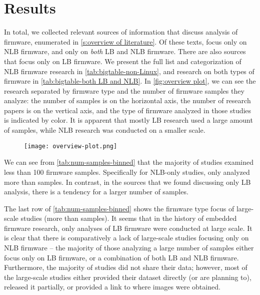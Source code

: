 \section{Results}\label{s:results}

In total, we collected  relevant sources of information that discuss analysis of firmware, enumerated in \autoref{s:overview of literature}.
Of these  texts,  focus only on NLB firmware, and  only on \textit{both} LB and NLB firmware.
There are also  sources that focus only on LB firmware.
We present the full list and categorization of NLB firmware research in \autoref{tab:bigtable-non-Linux}, and research on both types of firmware in \autoref{tab:bigtable-both LB and NLB}.
In \autoref{fig:overview plot}, we can see the research separated by firmware type and the number of firmware samples they analyze: the number of samples is on the horizontal axis, the number of research papers is on the vertical axis, and the type of firmware analyzed in those studies is indicated by color.
It is apparent that mostly LB research used a large amount of samples, while NLB research was conducted on a smaller scale.

\begin{figure}[hb]
  \centering
  \texttt{[image: overview-plot.png]}
  \label{fig:overview plot}
\end{figure}

We can see from \autoref{tab:num-samples-binned} that the majority of studies examined less than \num{100} firmware samples.
Specifically for NLB-only studies, only  analyzed more than  samples.
In contrast, in the sources that we found discussing only LB analysis, there is a tendency for a larger number of samples.


The last row of \autoref{tab:num-samples-binned} shows the firmware type focus of large-scale studies (more than  samples).
It seems that in the history of embedded firmware research, only  analyses of LB firmware were conducted at large scale.
It is clear that there is comparatively a lack of large-scale studies focusing only on NLB firmware -- the majority of those analyzing a large number of samples either focus only on LB firmware, or a combination of both LB and NLB firmware.
Furthermore, the majority of studies did not share their data; however, most of the large-scale studies either provided their dataset directly (or are planning to), released it partially, or provided a link to where images were obtained.

